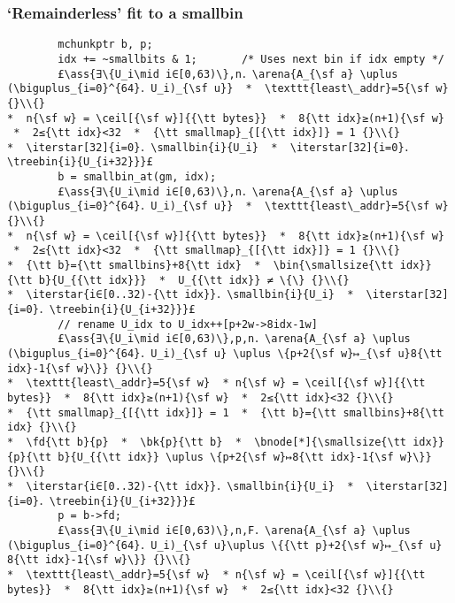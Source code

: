 \documentclass[10pt,a4paper,twoside]{report}
\makeatletter
\newcommand{\ml}[2][t]{\mbox{\mdseries\begin{tabular}[#1]{@{}L@{}}#2\end{tabular}}}
\newcommand{\ass}[1]{\ensuremath{{\color{blue}\left\{\ml[c]{#1}\right\}}}}
\renewcommand{\ceil}[2][]{\left\lceil{#2}\right\rceil_{#1}}
\newcommand{\iterstar}[2][]{\text{\LARGE $*$}^{#1}_{#2}}
\makeatother
\begin{document}
\subsubsection*{`Remainderless' fit to a smallbin}\label{sect:remainderless_fit_to_a_smallbin}
\begin{lstlisting}
        mchunkptr b, p;
        idx += ~smallbits & 1;       /* Uses next bin if idx empty */
        £\ass{∃\{U_i\mid i∈[0,63)\},n．\arena{A_{\sf a} \uplus (\biguplus_{i=0}^{64}．U_i)_{\sf u}}  *  \texttt{least\_addr}=5{\sf w} {}\\{}
*  n{\sf w} = \ceil[{\sf w}]{{\tt bytes}}  *  8{\tt idx}≥(n+1){\sf w}  *  2≤{\tt idx}<32  *  {\tt smallmap}_{[{\tt idx}]} = 1 {}\\{}
*  \iterstar[32]{i=0}．\smallbin{i}{U_i}  *  \iterstar[32]{i=0}．\treebin{i}{U_{i+32}}}£     
        b = smallbin_at(gm, idx);
        £\ass{∃\{U_i\mid i∈[0,63)\},n．\arena{A_{\sf a} \uplus (\biguplus_{i=0}^{64}．U_i)_{\sf u}}  *  \texttt{least\_addr}=5{\sf w} {}\\{}
*  n{\sf w} = \ceil[{\sf w}]{{\tt bytes}}  *  8{\tt idx}≥(n+1){\sf w}  *  2≤{\tt idx}<32  *  {\tt smallmap}_{[{\tt idx}]} = 1 {}\\{}
*  {\tt b}={\tt smallbins}+8{\tt idx}  *  \bin{\smallsize{\tt idx}}{\tt b}{U_{{\tt idx}}}  *  U_{{\tt idx}} ≠ \{\} {}\\{}
*  \iterstar{i∈[0..32)-{\tt idx}}．\smallbin{i}{U_i}  *  \iterstar[32]{i=0}．\treebin{i}{U_{i+32}}}£ 
        // rename U_idx to U_idx++[p+2w->8idx-1w]
        £\ass{∃\{U_i\mid i∈[0,63)\},p,n．\arena{A_{\sf a} \uplus (\biguplus_{i=0}^{64}．U_i)_{\sf u} \uplus \{p+2{\sf w}↦_{\sf u}8{\tt idx}-1{\sf w}\}} {}\\{}
*  \texttt{least\_addr}=5{\sf w}  * n{\sf w} = \ceil[{\sf w}]{{\tt bytes}}  *  8{\tt idx}≥(n+1){\sf w}  *  2≤{\tt idx}<32 {}\\{}
*  {\tt smallmap}_{[{\tt idx}]} = 1  *  {\tt b}={\tt smallbins}+8{\tt idx} {}\\{}
*  \fd{\tt b}{p}  *  \bk{p}{\tt b}  *  \bnode[*]{\smallsize{\tt idx}}{p}{\tt b}{U_{{\tt idx}} \uplus \{p+2{\sf w}↦8{\tt idx}-1{\sf w}\}} {}\\{}
*  \iterstar{i∈[0..32)-{\tt idx}}．\smallbin{i}{U_i}  *  \iterstar[32]{i=0}．\treebin{i}{U_{i+32}}}£ 
        p = b->fd;
        £\ass{∃\{U_i\mid i∈[0,63)\},n,F．\arena{A_{\sf a} \uplus (\biguplus_{i=0}^{64}．U_i)_{\sf u}\uplus \{{\tt p}+2{\sf w}↦_{\sf u} 8{\tt idx}-1{\sf w}\}} {}\\{} 
*  \texttt{least\_addr}=5{\sf w}  * n{\sf w} = \ceil[{\sf w}]{{\tt bytes}}  *  8{\tt idx}≥(n+1){\sf w}  *  2≤{\tt idx}<32 {}\\{}

\end{lstlisting}
\end{document}
